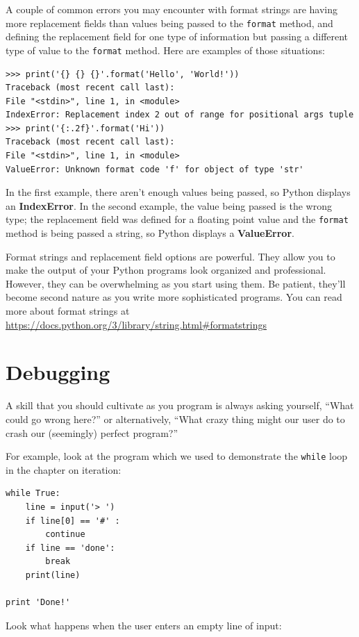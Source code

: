 A couple of common errors you may encounter with format strings are having more replacement fields than values being passed to the {\tt format} method, and defining the replacement field for one type of information but passing a different type of value to the {\tt format} method. Here are examples of those situations:


\beforeverb
\begin{verbatim}
>>> print('{} {} {}'.format('Hello', 'World!'))
Traceback (most recent call last):
File "<stdin>", line 1, in <module>
IndexError: Replacement index 2 out of range for positional args tuple
>>> print('{:.2f}'.format('Hi'))
Traceback (most recent call last):
File "<stdin>", line 1, in <module>
ValueError: Unknown format code 'f' for object of type 'str'
\end{verbatim}
\afterverb
%
In the first example, there aren't enough values being passed, so Python displays an \textbf{IndexError}. In the
second example, the value being passed is the wrong type; the replacement field was defined for a floating point value and the {\tt format} method is being passed a string, so Python displays a \textbf{ValueError}.

Format strings and replacement field options are powerful. They allow you to make the output of your Python programs look organized and professional. However, they can be overwhelming as you start using them. Be patient, they'll become second nature as you write more sophisticated programs. You
can read more about format strings at
\url{https://docs.python.org/3/library/string.html#formatstrings}


\section{Debugging}

A skill that you should cultivate as you program is always
asking yourself, ``What could go wrong here?'' or alternatively,
``What crazy thing might our user do to crash our (seemingly) 
perfect program?''

For example, look at the program which we used to demonstrate
the {\tt while} loop in the chapter on iteration:

\beforeverb
\begin{verbatim}
while True:
    line = input('> ')
    if line[0] == '#' :
        continue
    if line == 'done':
        break
    print(line)

print 'Done!'
\end{verbatim}
\afterverb
%
Look what happens when the user enters an empty line of input:

